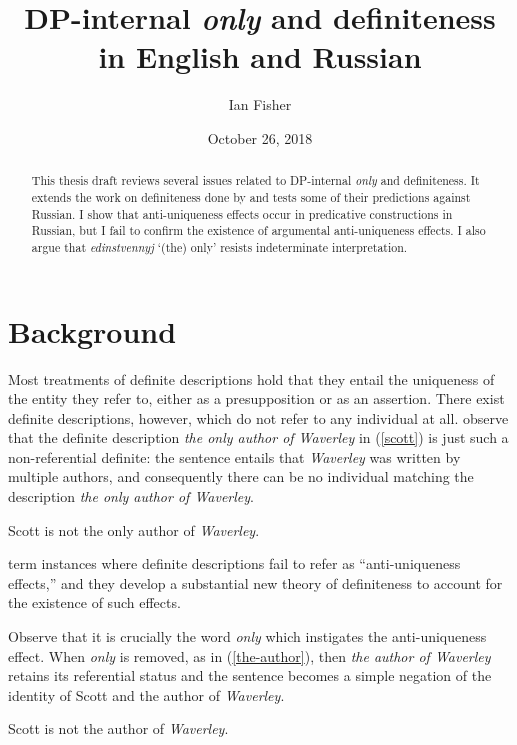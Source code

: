 \documentclass{article}
\title{DP-internal \textit{only} and definiteness in English and Russian}
\author{Ian Fisher}
\date{October 26, 2018}
\begin{document}
\maketitle


\begin{abstract}

This thesis draft reviews several issues related to DP-internal \textit{only} and definiteness. It extends the work on definiteness done by \citet{cb2015, cb2012a, cb2012b} and tests some of their predictions against Russian. I show that anti-uniqueness effects occur in predicative constructions in Russian, but I fail to confirm the existence of argumental anti-uniqueness effects. I also argue that \textit{edinstvennyj} `(the) only' resists indeterminate interpretation.
\end{abstract}


\section{Background}
Most treatments of definite descriptions hold that they entail the uniqueness of the entity they refer to, either as a presupposition or as an assertion. There exist definite descriptions, however, which do not refer to any individual at all. \citet{cb2015} observe that the definite description \textit{the only author of Waverley} in (\ref{scott}) is just such a non-referential definite: the sentence entails that \textit{Waverley} was written by multiple authors, and consequently there can be no individual matching the description \textit{the only author of Waverley}.

\begin{exe}
	\ex \label{scott} Scott is not the only author of \textit{Waverley}.
\end{exe}

\citeauthor{cb2015} term instances where definite descriptions fail to refer as ``anti-uniqueness effects,'' and they develop a substantial new theory of definiteness to account for the existence of such effects.

Observe that it is crucially the word \textit{only} which instigates the anti-uniqueness effect. When \textit{only} is removed, as in (\ref{the-author}), then \textit{the author of Waverley} retains its referential status and the sentence becomes a simple negation of the identity of Scott and the author of \textit{Waverley}.

\begin{exe}
	\ex \label{the-author} Scott is not the author of \textit{Waverley}.
\end{exe}
\end{document}
